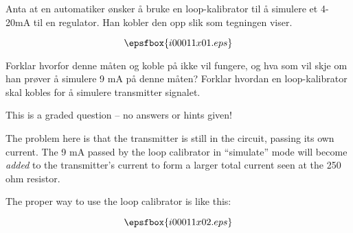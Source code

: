 

Anta at en automatiker {\o}nsker {\aa} bruke en loop-kalibrator til {\aa} simulere et 4-20mA til en regulator. Han kobler den opp slik som tegningen viser. 

$$\epsfbox{i00011x01.eps}$$

Forklar hvorfor denne m{\aa}ten og koble p{\aa} ikke vil fungere, og hva som vil skje om han pr{\o}ver {\aa} simulere 9 mA p{\aa} denne m{\aa}ten? Forklar hvordan en loop-kalibrator skal kobles for {\aa} simulere transmitter signalet. 

\vfil

\eject






This is a graded question -- no answers or hints given!







The problem here is that the transmitter is still in the circuit, passing its own current.  The 9 mA passed by the loop calibrator in ``simulate'' mode will become {\it added} to the transmitter's current to form a larger total current seen at the 250 ohm resistor.

The proper way to use the loop calibrator is like this:

$$\epsfbox{i00011x02.eps}$$




